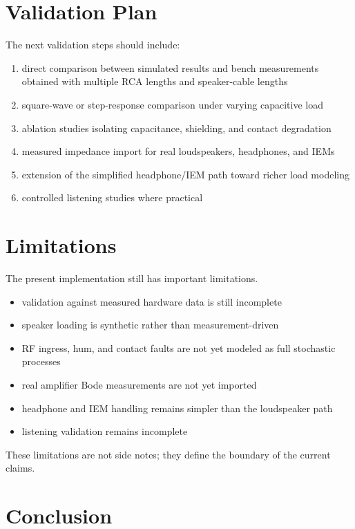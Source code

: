 \documentclass[a4paper,11pt]{article}
\begin{document}
\section{Validation Plan}

The next validation steps should include:

\begin{enumerate}
  \item direct comparison between simulated results and bench measurements obtained with multiple RCA lengths and speaker-cable lengths
  \item square-wave or step-response comparison under varying capacitive load
  \item ablation studies isolating capacitance, shielding, and contact degradation
  \item measured impedance import for real loudspeakers, headphones, and IEMs
  \item extension of the simplified headphone/IEM path toward richer load modeling
  \item controlled listening studies where practical
\end{enumerate}

\section{Limitations}

The present implementation still has important limitations.

\begin{itemize}
  \item validation against measured hardware data is still incomplete
  \item speaker loading is synthetic rather than measurement-driven
  \item RF ingress, hum, and contact faults are not yet modeled as full stochastic processes
  \item real amplifier Bode measurements are not yet imported
  \item headphone and IEM handling remains simpler than the loudspeaker path
  \item listening validation remains incomplete
\end{itemize}

These limitations are not side notes; they define the boundary of the current
claims.

\section{Conclusion}
\end{document}
